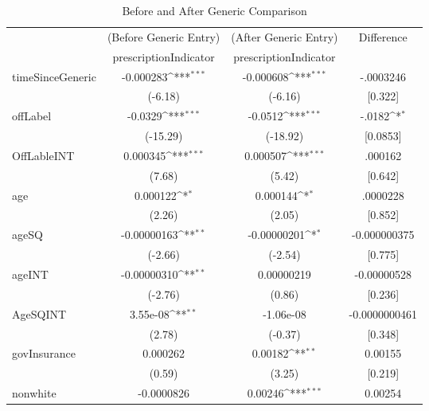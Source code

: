\begin{table}[htbp]\centering
\def\sym#1{\ifmmode^{#1}\else\(^{#1}\)\fi}
\caption{Before and After Generic Comparison\label{tab1}}
\begin{tabular}{l*{3}{c}}
\hline\hline
            &\multicolumn{1}{c}{(Before Generic Entry)}&\multicolumn{1}{c}{(After Generic Entry)}&\multicolumn{1}{c}{Difference}\\
            &\multicolumn{1}{c}{prescriptionIndicator}&\multicolumn{1}{c}{prescriptionIndicator}&\multicolumn{1}{c}{}\\
\hline
timeSinceGeneric&   -0.000283\sym{***}&   -0.000608\sym{***}&   -.0003246\\
            &     (-6.18)         &     (-6.16)         &     [0.322]         \\
[1em]
offLabel    &     -0.0329\sym{***}&     -0.0512\sym{***}&   -.0182\sym{*}\\
            &    (-15.29)         &    (-18.92)         &    [0.0853]         \\
[1em]
OffLableINT &    0.000345\sym{***}&    0.000507\sym{***}&   .000162\\
            &      (7.68)         &      (5.42)         &    [0.642]         \\
[1em]
age         &    0.000122\sym{*}  &    0.000144\sym{*}  &   .0000228\\
            &      (2.26)         &      (2.05)         &    [0.852]         \\
[1em]
ageSQ       & -0.00000163\sym{**} & -0.00000201\sym{*}  &   -0.000000375\\
            &     (-2.66)         &     (-2.54)         &    [0.775]         \\
[1em]
ageINT      & -0.00000310\sym{**} &  0.00000219         &   -0.00000528\\
            &     (-2.76)         &      (0.86)         &    [0.236]         \\
[1em]
AgeSQINT    &    3.55e-08\sym{**} &   -1.06e-08         &   -0.0000000461\\
            &      (2.78)         &     (-0.37)         &    [0.348]         \\
[1em]
govInsurance&    0.000262         &     0.00182\sym{**} &   0.00155\\
            &      (0.59)         &      (3.25)         &    [0.219]         \\
[1em]
nonwhite    &  -0.0000826         &     0.00246\sym{***}&   0.00254\\

\end{tabular}
\end{table}

